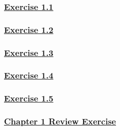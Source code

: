 \documentclass[
  11pt,
  openany]{book}
\begin{document}
\subsubsection*{\texorpdfstring{\hyperref[ex11q]{Exercise 1.1}}{Exercise 1.1}}\label{exercise-1.1-1}

\protect{}\label{ex12a}{}

\subsubsection*{\texorpdfstring{\hyperref[ex12q]{Exercise 1.2}}{Exercise 1.2}}\label{exercise-1.2-1}

\protect{}\label{ex13a}{}

\subsubsection*{\texorpdfstring{\hyperref[ex13q]{Exercise 1.3}}{Exercise 1.3}}\label{exercise-1.3-1}

\protect{}\label{ex14a}{}

\subsubsection*{\texorpdfstring{\hyperref[ex14q]{Exercise 1.4}}{Exercise 1.4}}\label{exercise-1.4-1}

\protect{}\label{ex15a}{}

\subsubsection*{\texorpdfstring{\hyperref[ex15q]{Exercise 1.5}}{Exercise 1.5}}\label{exercise-1.5-1}

\protect{}\label{re1a}{}

\subsubsection*{\texorpdfstring{\hyperref[re1q]{Chapter 1 Review Exercise}}{Chapter 1 Review Exercise}}\label{chapter-1-review-exercise}

\endgroup


\end{document}
